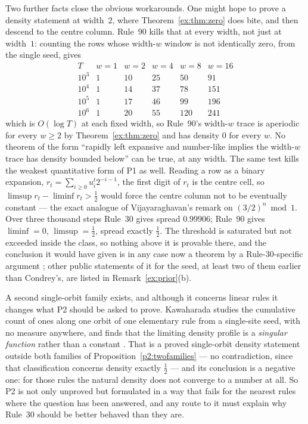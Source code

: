 \documentclass[11pt]{article}
\theoremstyle{definition}
\theoremstyle{remark}
\begin{document}
Two further facts close the obvious workarounds. One might hope to prove a density statement at
width~$2$, where Theorem~\ref{ex:thm:zero} does bite, and then descend to the centre column. Rule~90
kills that at every width, not just at width~$1$: counting the rows whose width-$w$ window is not
identically zero, from the single seed, gives
\[
\begin{array}{lrrrrr}
T & w=1 & w=2 & w=4 & w=8 & w=16\\
10^{3} & 1 & 10 & 25 & 50 & 91\\
10^{4} & 1 & 14 & 37 & 78 & 151\\
10^{5} & 1 & 17 & 46 & 99 & 196\\
10^{6} & 1 & 20 & 55 & 120 & 241
\end{array}
\]
which is $O(\log T)$ at each fixed width, so Rule~90's width-$w$ trace is aperiodic for every $w\ge2$
by Theorem~\ref{ex:thm:zero} and has density $0$ for every $w$. No theorem of the form ``rapidly left
expansive and number-like implies the width-$w$ trace has density bounded below'' can be true, at any
width. The same test kills the weakest quantitative form of P1 as well. Reading a row as a binary
expansion, $r_t=\sum_{i\ge0}u^t_i2^{-i-1}$, the first digit of $r_t$ is the centre cell, so
$\limsup r_t-\liminf r_t>\tfrac12$ would force the centre column not to be eventually constant --- the
exact analogue of Vijayaraghavan's remark on $(3/2)^n\bmod1$. Over three thousand steps Rule~30 gives
spread $0.99906$; Rule~90 gives $\liminf=0$, $\limsup=\tfrac12$, spread exactly $\tfrac12$. The
threshold is saturated but not exceeded inside the class, so nothing above it is provable there, and
the conclusion it would have given is in any case now a theorem by a Rule-30-specific argument
\cite[Cor.~5]{Condrey}; other public statements of it for the seed, at least two of them earlier than Condrey's, are listed in Remark~\ref{ex:prior}(b).

A second single-orbit family exists, and although it concerns linear rules it changes what P2 should be
asked to prove. Kawaharada studies the cumulative count of ones along one orbit of one elementary rule
from a single-site seed, with no measure anywhere, and finds that the limiting density profile is a
\emph{singular function} rather than a constant \cite{Kawa}. That is a proved single-orbit density statement outside both families of
Proposition~\ref{p2:twofamilies} --- no contradiction, since that classification concerns density exactly $\tfrac12$ --- and its conclusion is a negative one: for
those rules the natural density does not converge to a number at all. So P2 is not only unproved but
formulated in a way that fails for the nearest rules where the question has been answered, and any
route to it must explain why Rule~30 should be better behaved than they are.
\end{document}
